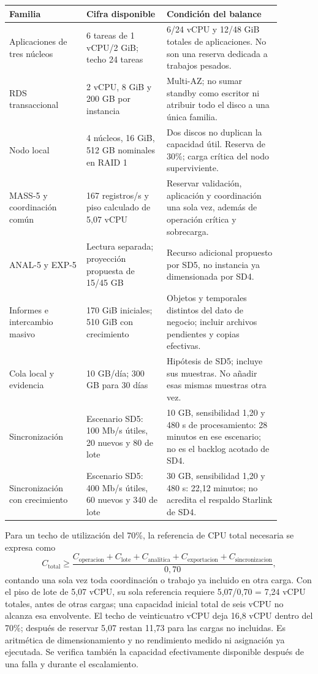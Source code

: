 \begingroup\small
\begin{longtable}{@{}p{0.25\linewidth}p{0.26\linewidth}p{0.37\linewidth}@{}}
\textbf{Familia} & \textbf{Cifra disponible} & \textbf{Condición del balance} \\
\hline
Aplicaciones de tres núcleos & 6 tareas de 1 vCPU/2 GiB; techo 24 tareas & 6/24 vCPU y 12/48 GiB totales de aplicaciones. No son una reserva dedicada a trabajos pesados. \\
RDS transaccional & 2 vCPU, 8 GiB y 200 GB por instancia & Multi-AZ; no sumar standby como escritor ni atribuir todo el disco a una única familia. \\
Nodo local & 4 núcleos, 16 GiB, 512 GB nominales en RAID 1 & Dos discos no duplican la capacidad útil. Reserva de 30\%; carga crítica del nodo superviviente. \\
MASS-5 y coordinación común & 167 registros/s y piso calculado de 5,07 vCPU & Reservar validación, aplicación y coordinación una sola vez, además de operación crítica y sobrecarga. \\
ANAL-5 y EXP-5 & Lectura separada; proyección propuesta de 15/45 GB & Recurso adicional propuesto por SD5, no instancia ya dimensionada por SD4. \\
Informes e intercambio masivo & 170 GiB iniciales; 510 GiB con crecimiento & Objetos y temporales distintos del dato de negocio; incluir archivos pendientes y copias efectivas. \\
Cola local y evidencia & 10 GB/día; 300 GB para 30 días & Hipótesis de SD5; incluye sus muestras. No añadir esas mismas muestras otra vez. \\
Sincronización & Escenario SD5: 100 Mb/s útiles, 20 nuevos y 80 de lote & 10 GB, sensibilidad 1,20 y 480 s de procesamiento: 28 minutos en ese escenario; no es el backlog acotado de SD4. \\
Sincronización con crecimiento & Escenario SD5: 400 Mb/s útiles, 60 nuevos y 340 de lote & 30 GB, sensibilidad 1,20 y 480 s: 22,12 minutos; no acredita el respaldo Starlink de SD4. \\
\end{longtable}
\endgroup

Para un techo de utilización del 70\%, la referencia de CPU total necesaria se expresa como
\[
 C_{\mathrm{total}} \geq
 \frac{C_{\mathrm{operacion}}+C_{\mathrm{lote}}+
 C_{\mathrm{analitica}}+C_{\mathrm{exportacion}}+
 C_{\mathrm{sincronizacion}}}{0{,}70},
\]
contando una sola vez toda coordinación o trabajo ya incluido en otra carga. Con el piso de lote de 5,07 vCPU, su sola referencia requiere 5,07/0,70 = 7,24 vCPU totales, antes de otras cargas; una capacidad inicial total de seis vCPU no alcanza esa envolvente. El techo de veinticuatro vCPU deja 16,8 vCPU dentro del 70\%; después de reservar 5,07 restan 11,73 para las cargas no incluidas. Es aritmética de dimensionamiento y no rendimiento medido ni asignación ya ejecutada. Se verifica también la capacidad efectivamente disponible después de una falla y durante el escalamiento.


